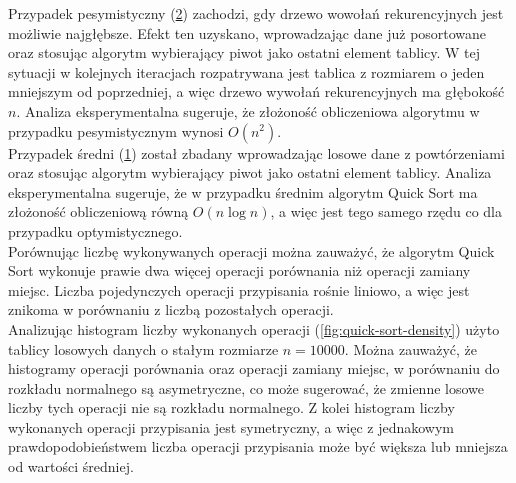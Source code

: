 Przypadek pesymistyczny (\ref{fig:quick-sort-pessimistic}) zachodzi, gdy drzewo wowołań rekurencyjnych jest możliwie najgłębsze. Efekt ten uzyskano, wprowadzając dane już posortowane oraz stosując algorytm wybierający piwot jako ostatni element tablicy. W tej sytuacji w kolejnych iteracjach rozpatrywana jest tablica z rozmiarem o jeden mniejszym od poprzedniej, a więc drzewo wywołań rekurencyjnych ma głębokość $n$. Analiza eksperymentalna sugeruje, że złożoność obliczeniowa algorytmu w przypadku pesymistycznym wynosi $O(n^2)$.\\

Przypadek średni (\ref{fig:quick-sort-optimistic-average}) został zbadany wprowadzając losowe dane z powtórzeniami oraz stosując algorytm wybierający piwot jako ostatni element tablicy. Analiza eksperymentalna sugeruje, że w przypadku średnim algorytm Quick Sort ma złożoność obliczeniową równą $O(n\log{}n)$, a więc jest tego samego rzędu co dla przypadku optymistycznego.\\

Porównując liczbę wykonywanych operacji można zauważyć, że algorytm Quick Sort wykonuje prawie dwa więcej operacji porównania niż operacji zamiany miejsc. Liczba pojedynczych operacji przypisania rośnie liniowo, a więc jest znikoma w porównaniu z liczbą pozostałych operacji.\\

Analizując histogram liczby wykonanych operacji (\ref{fig:quick-sort-density}) użyto tablicy losowych danych o stałym rozmiarze $n = 10000$. Można zauważyć, że histogramy operacji porównania oraz operacji zamiany miejsc, w porównaniu do rozkładu normalnego są asymetryczne, co może sugerować, że zmienne losowe liczby tych operacji nie są rozkładu normalnego. Z kolei histogram liczby wykonanych operacji przypisania jest symetryczny, a więc z jednakowym prawdopodobieństwem liczba operacji przypisania może być większa lub mniejsza od wartości średniej.\\

\begin{figure}[]
	\centering
	
	\caption[]{}
	\label{fig:quick-sort-optimistic-average}
\end{figure}

\begin{figure}[]
	\centering
	
	\caption[]{}
	\label{fig:quick-sort-pessimistic}
\end{figure}

